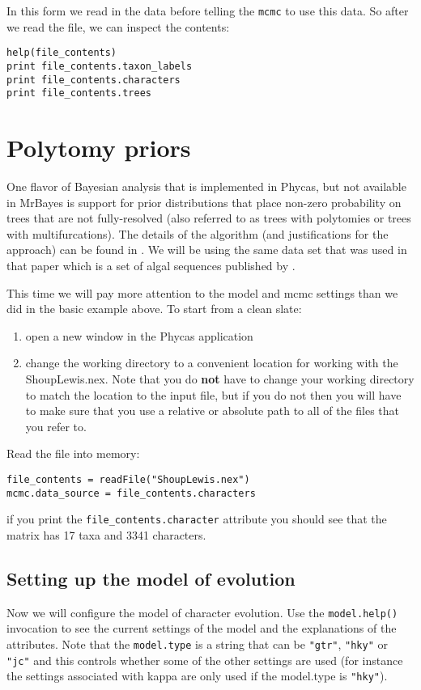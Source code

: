 \documentclass{article}
\newcommand{\cmd}[1]{\texttt{#1}\xspace}
\newcommand{\mb}{MrBayes\xspace}
\newcommand{\phycas}{Phycas\xspace}
\newcommand{\localfile}[1]{\textsf{#1}\xspace}
\begin{document}
In this form we read in the data before telling the \cmd{mcmc} to use this data.
So after we read the file, we can inspect the contents:
\begin{verbatim}
help(file_contents)
print file_contents.taxon_labels
print file_contents.characters
print file_contents.trees
\end{verbatim}



\section{Polytomy priors}
One flavor of Bayesian analysis that is implemented in \phycas, but not available in \mb is support for prior distributions that place non-zero probability on trees that are not fully-resolved (also referred to as trees with polytomies or trees with multifurcations).
The details of the algorithm (and justifications for the approach) can be found in \citet{LewisHH2005}.
We will be using the same data set that was used in that paper which is a set of algal sequences published by \citet{ShoupL2003}.

This time we will pay more attention to the model and mcmc settings than we did in the basic example above.
To start from a clean slate:
\begin{enumerate}
	\item open a new window in the \phycas application
	\item change the working directory to a convenient location for working with the \localfile{ShoupLewis.nex}. Note that you do {\bf not} have to change your working directory to match the location to the input file, but if you do not then you will have to make sure that you use a relative or absolute path to all of the files that you refer to.
\end{enumerate}

Read the file into memory:
\begin{verbatim}
file_contents = readFile("ShoupLewis.nex")
mcmc.data_source = file_contents.characters
\end{verbatim}
if you print the \cmd{file\_contents.character} attribute you should see that the matrix has 17 taxa and 3341 characters.

\subsection{Setting up the model of evolution}
Now we will configure the model of character evolution. 
Use the \cmd{model.help()} invocation to see the current settings of the model and the explanations of the
attributes.
Note that the \cmd{model.type} is a string that can be \texttt{"gtr"}, \texttt{"hky"} or \texttt{"jc"} and this controls whether some of the other settings are used (for instance the settings associated with kappa are only used if the model.type is \texttt{"hky"}).
\end{document}
